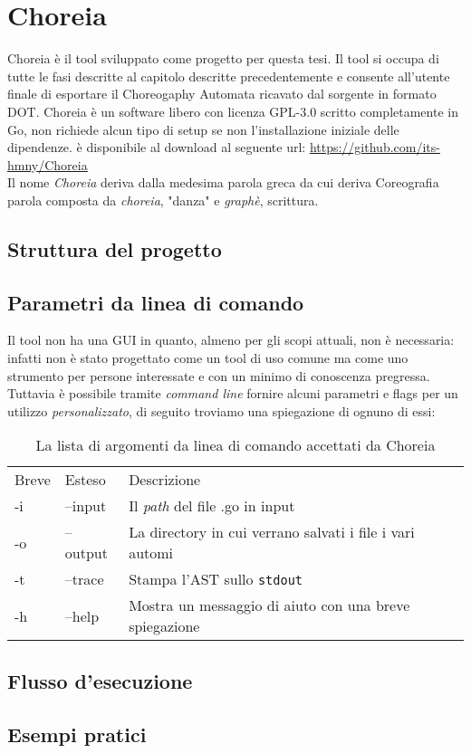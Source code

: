 \chapter{Choreia}
Choreia è il tool sviluppato come progetto per questa tesi. Il tool si occupa di tutte le fasi descritte al capitolo descritte precedentemente e consente all'utente finale di esportare il Choreogaphy Automata ricavato dal sorgente in formato DOT.
Choreia è un software libero con licenza GPL-3.0 scritto completamente in Go, non richiede alcun tipo di setup se non l'installazione iniziale delle dipendenze. è disponibile al download al seguente url: \url{https://github.com/its-hmny/Choreia} \\
Il nome \emph{Choreia} deriva dalla medesima parola greca da cui deriva Coreografia parola composta da \emph{choreia}, "danza" e \emph{graphè}, scrittura.

\section{Struttura del progetto}

\section{Parametri da linea di comando}
Il tool non ha una GUI in quanto, almeno per gli scopi attuali, non è necessaria: infatti non è stato progettato come un tool di uso comune ma come uno strumento per persone interessate e con un minimo di conoscenza pregressa.\\
Tuttavia è possibile tramite \emph{command line} fornire alcuni parametri e flags per un utilizzo \emph{personalizzato}, di seguito troviamo una spiegazione di ognuno di essi:
\begin{table}[h!]
    \centering
    \begin{tabular}{l l l}
        Breve & Esteso   & Descrizione                                               \\
        -i    & --input  & Il \emph{path} del file .go in input                      \\
        -o    & --output & La directory in cui verrano salvati i file i vari automi \\
        -t    & --trace  & Stampa l'AST sullo \texttt{stdout}                       \\
        -h    & --help   & Mostra un messaggio di aiuto con una breve spiegazione    \\
    \end{tabular}
    \caption{La lista di argomenti da linea di comando  accettati da Choreia}
\end{table}

\section{Flusso d'esecuzione}

\section{Esempi pratici}